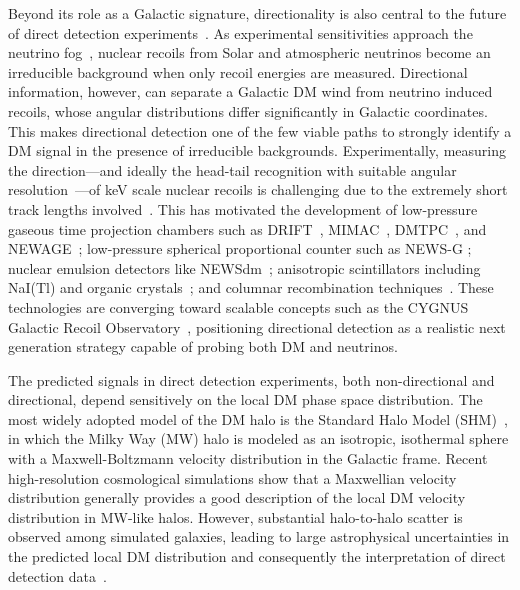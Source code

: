 \documentclass[a4paper,11pt]{article}
\begin{document}
Beyond its role as a Galactic signature, directionality is also central to the future of direct detection experiments~\cite{Spergel:1987kx}. As experimental sensitivities approach the neutrino fog~\cite{OHare:2021utq}, nuclear recoils from Solar and atmospheric neutrinos become an irreducible background when only recoil energies are measured. Directional information, however, can separate a Galactic DM wind from neutrino induced recoils, whose angular distributions differ significantly in Galactic coordinates. This makes directional detection one of the few viable paths to strongly identify a DM signal in the presence of irreducible backgrounds. Experimentally, measuring the direction---and ideally the head-tail recognition with suitable angular resolution~\cite{Vahsen:2021gnb}---of keV scale nuclear recoils is challenging due to the extremely short track lengths involved~\cite{Mayet:2016zxu,Vahsen:2021gnb,Baracchini:2023kyk}. This has motivated the development of low-pressure gaseous time projection chambers such as DRIFT~\cite{Snowden-Ifft:1999reu,Burgos:2007zz}, MIMAC~\cite{Billard_2012,Santos_2018}, DMTPC~\cite{Ahlen:2010ub}, and NEWAGE~\cite{Miuchi:2010hn,Nakamura:2015iza,Shimada:2023vky}; low-pressure spherical proportional counter such as NEWS-G \cite{NEWS-G:2022kon, Coquillat:2025ahd}; nuclear emulsion detectors like NEWSdm~\cite{Alexandrov:2019gme,Golovatiuk:2021jcf}; anisotropic scintillators including NaI(Tl) and organic crystals~\cite{SHIMIZU2003347,Schuster:2016kpt}; and columnar recombination techniques~\cite{Nygren:2013nda, Mohlabeng:2015efa}. These technologies are converging toward scalable concepts such as the CYGNUS Galactic Recoil Observatory~\cite{Baracchini:2020btb,Vahsen:2020pzb, Lisotti:2024fco, Amaro:2022gub}, positioning directional detection as a realistic next generation strategy capable of probing both DM and neutrinos.




The predicted signals in direct detection experiments, both non-directional and directional, depend sensitively on the local DM phase space distribution. The most widely adopted model of the DM halo is the Standard Halo Model (SHM)~\cite{PhysRevD.33.3495}, in which the Milky Way (MW) halo is modeled as an isotropic, isothermal sphere with a Maxwell-Boltzmann velocity distribution in the Galactic  frame. Recent high-resolution cosmological simulations show that a Maxwellian velocity distribution generally provides a good description of the local DM velocity distribution in MW-like halos. However, substantial halo-to-halo scatter is observed among simulated galaxies, leading to large astrophysical uncertainties in the predicted local DM distribution and consequently the interpretation of direct detection data~\cite{Bozorgnia:2016ogo, Kelso:2016qqj, Sloane:2016kyi,  Bozorgnia:2017brl,  Bozorgnia:2019mjk, Poole-McKenzie:2020dbo, Lawrence:2022niq, Kuhlen:2013tra, Lacroix:2020lhn, Santos-Santos:2023ubx}.
\end{document}
